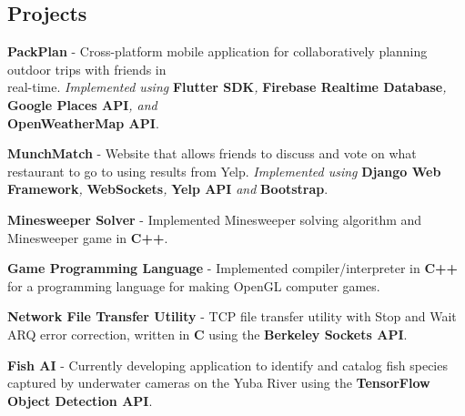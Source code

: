 \documentclass[letterpaper]{article}
\renewenvironment{itemize}{
  \begin{list}{}{
    \setlength{\leftmargin}{1.5em}
  }
}{
  \end{list}
}
\begin{document}
{\subsection*{Projects}
\begin{itemize}
    \item[$\bullet$] \textbf{PackPlan} - Cross-platform mobile application for collaboratively planning outdoor trips with friends in \\real-time. \emph{Implemented using }\textbf{Flutter SDK}\emph{, }\textbf{Firebase Realtime Database}\emph{, }\textbf{Google Places API}\emph{, and }\\\textbf{OpenWeatherMap API}.
    \item[$\bullet$] \textbf{MunchMatch} - Website that allows friends to discuss and vote on what restaurant to go to using results from Yelp. \emph{Implemented using }\textbf{Django Web Framework}\emph{, }\textbf{WebSockets}\emph{, }\textbf{Yelp API}\emph{ and }\textbf{Bootstrap}.
    \item[$\bullet$] \textbf{Minesweeper Solver} - Implemented Minesweeper solving algorithm and Minesweeper game in \textbf{C++}.
    \item[$\bullet$] \textbf{Game Programming Language} - Implemented compiler/interpreter in \textbf{C++} for a programming language for making OpenGL computer games.
    \item[$\bullet$] \textbf{Network File Transfer Utility} - TCP file transfer utility with Stop and Wait ARQ error correction, written in \textbf{C} using the \textbf{Berkeley Sockets API}.
    \item[$\bullet$] \textbf{Fish AI} - Currently developing application to identify and catalog fish species captured by underwater cameras on the Yuba River using the \textbf{TensorFlow Object Detection API}.
\end{itemize}
\end{document}
